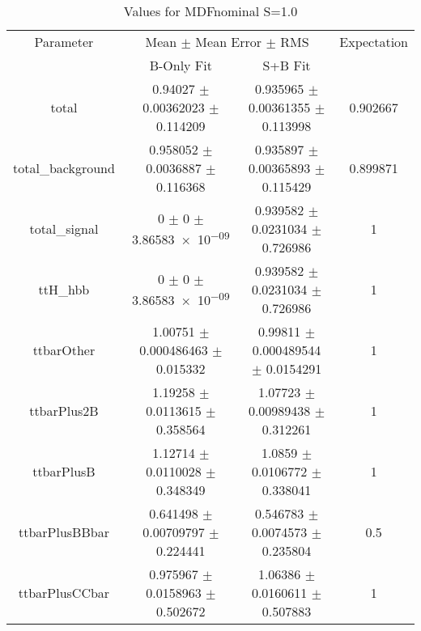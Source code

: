 \begin{table}
\centering
\caption{Values for MDFnominal S=1.0}
\begin{tabular}{cccc}
\toprule
Parameter & \multicolumn{2}{c}{Mean $\pm$ Mean Error $\pm$ RMS} & Expectation\\
 & B-Only Fit & S+B Fit & \\
\midrule
total & \num{0.94027} $\pm$ \num{0.00362023} $\pm$ \num{0.114209} & \num{0.935965} $\pm$ \num{0.00361355} $\pm$ \num{0.113998} & \num{0.902667}\\
total\_background & \num{0.958052} $\pm$ \num{0.0036887} $\pm$ \num{0.116368} & \num{0.935897} $\pm$ \num{0.00365893} $\pm$ \num{0.115429} & \num{0.899871}\\
total\_signal & \num{0} $\pm$ \num{0} $\pm$ \num{3.86583e-09} & \num{0.939582} $\pm$ \num{0.0231034} $\pm$ \num{0.726986} & \num{1}\\
ttH\_hbb & \num{0} $\pm$ \num{0} $\pm$ \num{3.86583e-09} & \num{0.939582} $\pm$ \num{0.0231034} $\pm$ \num{0.726986} & \num{1}\\
ttbarOther & \num{1.00751} $\pm$ \num{0.000486463} $\pm$ \num{0.015332} & \num{0.99811} $\pm$ \num{0.000489544} $\pm$ \num{0.0154291} & \num{1}\\
ttbarPlus2B & \num{1.19258} $\pm$ \num{0.0113615} $\pm$ \num{0.358564} & \num{1.07723} $\pm$ \num{0.00989438} $\pm$ \num{0.312261} & \num{1}\\
ttbarPlusB & \num{1.12714} $\pm$ \num{0.0110028} $\pm$ \num{0.348349} & \num{1.0859} $\pm$ \num{0.0106772} $\pm$ \num{0.338041} & \num{1}\\
ttbarPlusBBbar & \num{0.641498} $\pm$ \num{0.00709797} $\pm$ \num{0.224441} & \num{0.546783} $\pm$ \num{0.0074573} $\pm$ \num{0.235804} & \num{0.5}\\
ttbarPlusCCbar & \num{0.975967} $\pm$ \num{0.0158963} $\pm$ \num{0.502672} & \num{1.06386} $\pm$ \num{0.0160611} $\pm$ \num{0.507883} & \num{1}\\
\bottomrule
\end{tabular}
\end{table}